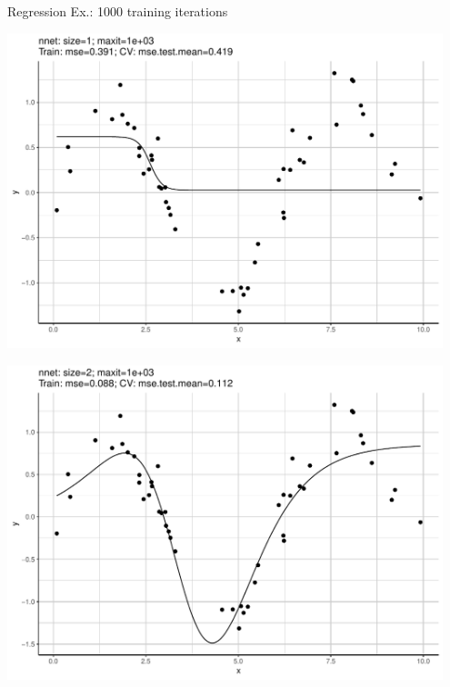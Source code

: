 \begin{vbframe}{Regression Ex.: 1000 training iterations}
\begin{knitrout}\scriptsize
{}\color{fgcolor}

{\centering \includegraphics[width=0.95\textwidth]{figure/unnamed-chunk-5-1} 

}




{\centering \includegraphics[width=0.95\textwidth]{figure/unnamed-chunk-5-2} 

}





\end{knitrout}
\end{vbframe}

